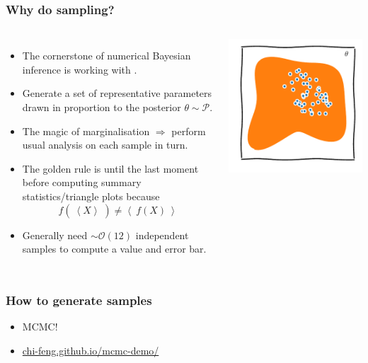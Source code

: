 \documentclass[aspectratio=169]{beamer}
\newcommand{\av}[2][]{\left\langle #2\right\rangle_{#1}}
\begin{document}
\begin{frame}
    \frametitle{Why do sampling?}
    \begin{columns}
        \begin{itemize}
            \item The cornerstone of numerical Bayesian inference is working with .
            \item Generate a set of representative parameters drawn in proportion to the posterior $\theta\sim\mathcal{P}$.
            \item The magic of marginalisation $\Rightarrow$ perform usual analysis on each sample in turn.
            \item The golden rule is  until the last moment before computing summary statistics/triangle plots because \[\boxed{f(\:\av{X}\:)\ne \av{\:f(X)\:}}\]
            \item Generally need $\sim\mathcal{O}(12)$ independent samples to compute a value and error bar.
        \end{itemize}
        \includegraphics{figures/samples.pdf}
    \end{columns}
\end{frame}

\begin{frame}
    \frametitle{How to generate samples}
    \begin{itemize}
        \item MCMC!
        \item \href{https://chi-feng.github.io/mcmc-demo/}{chi-feng.github.io/mcmc-demo/}
    \end{itemize}
\end{frame}
\end{document}
